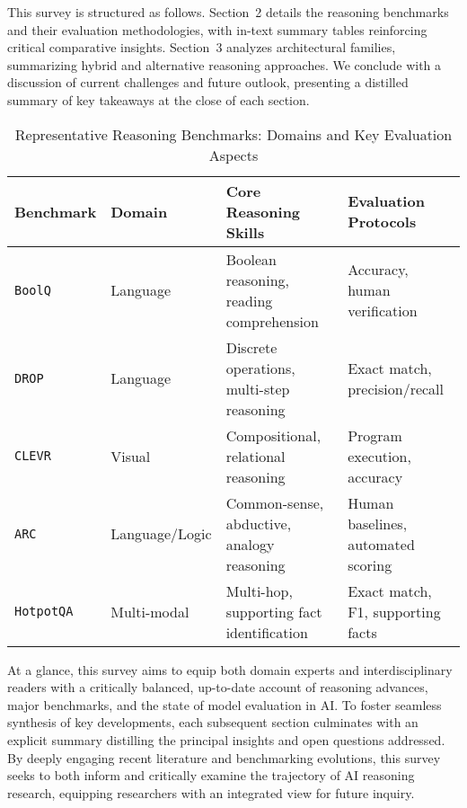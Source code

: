 \documentclass[sigconf]{acmart}
\begin{document}
This survey is structured as follows. Section~2 details the reasoning benchmarks and their evaluation methodologies, with in-text summary tables reinforcing critical comparative insights. Section~3 analyzes architectural families, summarizing hybrid and alternative reasoning approaches. We conclude with a discussion of current challenges and future outlook, presenting a distilled summary of key takeaways at the close of each section.

\begin{table*}[htbp]
\centering
\caption{Representative Reasoning Benchmarks: Domains and Key Evaluation Aspects}
\label{tab:benchmarks}
\begin{adjustbox}{max width=\textwidth}
\begin{tabular}{@{}llll@{}}
\toprule
Benchmark & Domain & Core Reasoning Skills & Evaluation Protocols \\
\midrule
\texttt{BoolQ}        & Language        & Boolean reasoning, reading comprehension    & Accuracy, human verification      \\
\texttt{DROP}         & Language        & Discrete operations, multi-step reasoning   & Exact match, precision/recall     \\
\texttt{CLEVR}        & Visual          & Compositional, relational reasoning         & Program execution, accuracy       \\
\texttt{ARC}          & Language/Logic  & Common-sense, abductive, analogy reasoning  & Human baselines, automated scoring\\
\texttt{HotpotQA}     & Multi-modal     & Multi-hop, supporting fact identification   & Exact match, F1, supporting facts \\
\bottomrule
\end{tabular}
\end{adjustbox}
\end{table*}

At a glance, this survey aims to equip both domain experts and interdisciplinary readers with a critically balanced, up-to-date account of reasoning advances, major benchmarks, and the state of model evaluation in AI. To foster seamless synthesis of key developments, each subsequent section culminates with an explicit summary distilling the principal insights and open questions addressed. By deeply engaging recent literature and benchmarking evolutions, this survey seeks to both inform and critically examine the trajectory of AI reasoning research, equipping researchers with an integrated view for future inquiry.
\end{document}
